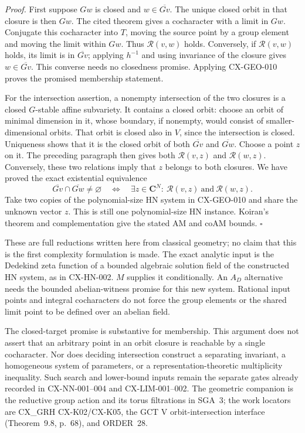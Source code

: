 \documentclass[11pt,a4paper]{article}
\begin{document}
\emph{Proof.} First suppose $Gw$ is closed and
$w\in\overline{Gv}$. The unique closed orbit in that closure is then
$Gw$. The cited theorem gives a cocharacter with a limit in $Gw$.
Conjugate this cocharacter into $T$, moving the source point by a group
element and moving the limit within $Gw$. Thus $\mathcal R(v,w)$
holds. Conversely, if $\mathcal R(v,w)$ holds, its limit is in
$\overline{Gv}$; applying $h^{-1}$ and using invariance of the closure
gives $w\in\overline{Gv}$. This converse needs no closedness promise.
Applying CX-GEO-010 proves the promised membership statement.

For the intersection assertion, a nonempty intersection of the two
closures is a closed $G$-stable affine subvariety. It contains a closed
orbit: choose an orbit of minimal dimension in it, whose boundary, if
nonempty, would consist of smaller-dimensional orbits. That orbit is
closed also in $V$, since the intersection is closed. Uniqueness shows
that it is the closed orbit of both $\overline{Gv}$ and
$\overline{Gw}$. Choose a point $z$ on it. The preceding paragraph
then gives both $\mathcal R(v,z)$ and $\mathcal R(w,z)$.
Conversely, these two relations imply that $z$ belongs to both closures.
We have proved the exact existential equivalence
\[
 \overline{Gv}\cap\overline{Gw}\ne\varnothing
       \quad\Longleftrightarrow\quad
       \exists z\in\mathbf C^N:\
                  \mathcal R(v,z)\ \text{and}\ \mathcal R(w,z).
\]
Take two copies of the polynomial-size HN system in CX-GEO-010 and share
the unknown vector $z$. This is still one polynomial-size HN instance.
Koiran's theorem and complementation give the stated AM and coAM bounds.
\hfill$\square$

These are full reductions written here from classical geometry; no claim
that this is the first complexity formulation is made. The exact analytic
input is the Dedekind zeta function of a bounded algebraic solution field
of the constructed HN system, as in CX-HN-002. $M$ supplies it
conditionally. An $A_D$ alternative needs the bounded abelian-witness
promise for this new system. Rational input points and integral
cocharacters do not force the group elements or the shared limit point
to be defined over an abelian field.

The closed-target promise is substantive for membership. This argument
does not assert that an arbitrary point in an orbit closure is reachable
by a single cocharacter. Nor does deciding intersection construct a
separating invariant, a homogeneous system of parameters, or a
representation-theoretic multiplicity inequality. Such search and
lower-bound inputs remain the separate gates already recorded in
CX-NN-001--004 and CX-LIM-001--002. The geometric companion is the
reductive group action and its torus filtrations in SGA~3; the work
locators are CX\_GRH CX-K02/CX-K05, the GCT V orbit-intersection
interface (Theorem~9.8, p.~68), and ORDER~28.
\end{document}
